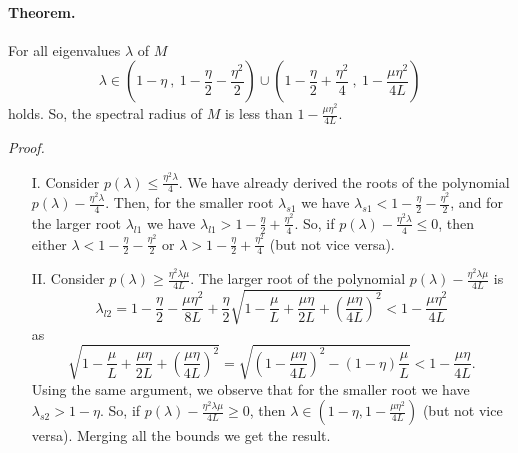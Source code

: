 \documentclass{article}
\begin{document}
\bigskip

\paragraph{Theorem.} For all eigenvalues $\lambda$ of $M$
\[
 \lambda\in\left(1-\eta \ , \ 1-\frac{\eta}{2}-\frac{\eta^2}{2}\right)\cup\left(1-\frac{\eta}{2}+\frac{\eta^2}{4} \ , \ 1-\frac{\mu\eta^2}{4L}\right)
\]
holds.  So, the spectral radius of $M$ is less than $1-\displaystyle\frac{\mu\eta^2}{4L}$.


\bigskip

\noindent
\textit{Proof.} 
\begin{itemize}
 \item[I.] Consider $p(\lambda)\leq \displaystyle\frac{\eta^2 \lambda}{4}$. We have already derived the roots of the polynomial $p(\lambda)-\displaystyle\frac{\eta^2 \lambda}{4}$. Then, 
 for the smaller root $\lambda_{s1}$ we have $\lambda_{s1}<1-\displaystyle\frac{\eta}{2}-\displaystyle\frac{\eta^2}{2}$, and for the larger root $\lambda_{l1}$ we have $\lambda_{l1}>1-\displaystyle\frac{\eta}{2}+\displaystyle\frac{\eta^2}{4}$.  So, if $p(\lambda)-\displaystyle\frac{\eta^2 \lambda}{4}\leq 0$, then either $\lambda < 1-\displaystyle\frac{\eta}{2}-\displaystyle\frac{\eta^2}{2}$ or $\lambda > 1-\displaystyle\frac{\eta}{2}+\displaystyle\frac{\eta^2}{4}$ (but not vice versa).
 \item[II.] Consider $p(\lambda)\geq \displaystyle\frac{\eta^2 \lambda\mu}{4L}$.  The larger root of the polynomial $p(\lambda)-\displaystyle\frac{\eta^2 \lambda\mu}{4L}$ is
 \[
  \lambda_{l2} = 1-\frac{\eta}{2}-\frac{\mu\eta^2}{8L}+\frac{\eta}{2}\sqrt{1-\frac{\mu}{L}+\frac{\mu\eta}{2L}+\left(\frac{\mu\eta}{4L}\right)^2}<1-\frac{\mu\eta^2}{4L}
 \]
as 
 \[
  \sqrt{1-\frac{\mu}{L}+\frac{\mu\eta}{2L}+\left(\frac{\mu\eta}{4L}\right)^2} = \sqrt{\left(1-\frac{\mu\eta}{4L}\right)^2-(1-\eta)\frac{\mu}{L}}<1-\frac{\mu\eta}{4L}.
 \]
Using the same argument, we observe that for the smaller root we have $\lambda_{s2}>1-\eta$.  So, if $p(\lambda)- \displaystyle\frac{\eta^2 \lambda\mu}{4L}\geq 0$, then $\lambda\in(1-\eta,1-\displaystyle\frac{\mu\eta^2}{4L})$ (but not vice versa). Merging all the bounds we get the result.

 
\end{itemize}
\end{document}
